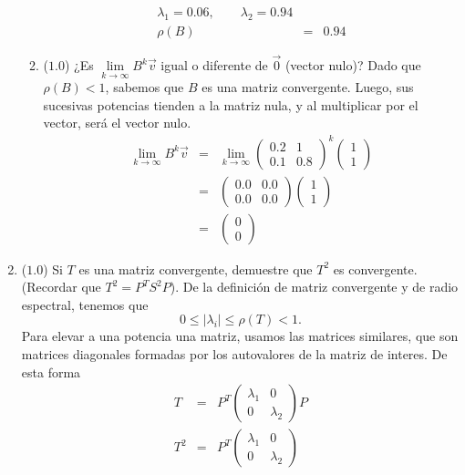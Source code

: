 \documentclass[12pt]{article}
\begin{document}
\begin{enumerate}[leftmargin=*,widest=9]
\begin{enumerate}[label=\alph*]
\begin{eqnarray*}
    \lambda_1 = 0.06, \qquad \lambda_2 = 0.94\\
    \rho(B) & = & 0.94
    \end{eqnarray*}
    \item (\(1.0\)) ¿Es \( \lim\limits_{k \rightarrow \infty}B^k \vec{v}\) igual o diferente de \(\vec{0}\) (vector nulo)?
    Dado que \(\rho(B) < 1\), sabemos que \(B\) es una matriz convergente. Luego, sus sucesivas potencias tienden a la matriz nula, y al multiplicar por el vector, será el vector nulo.
    \begin{eqnarray*}
    \lim\limits_{k \rightarrow \infty}B^k \vec{v} & = & \lim\limits_{k \rightarrow \infty}\begin{pmatrix}
    0.2 & 1 \\ 0.1 & 0.8
    \end{pmatrix}^k\begin{pmatrix}
    1 \\ 1
    \end{pmatrix} \\
    & = & \begin{pmatrix}
    0.0 & 0.0 \\ 0.0 & 0.0
    \end{pmatrix}\begin{pmatrix}
    1 \\ 1
    \end{pmatrix} \\
    & = & \begin{pmatrix}
    0 \\ 0
    \end{pmatrix}
    \end{eqnarray*}
    \end{enumerate}
  \item (\(1.0\)) Si \(T\) es una matriz convergente, demuestre que \(T^2\) es convergente. (Recordar que \(T^2 = P^T S^2 P\)).
  De la definición de matriz convergente y de radio espectral, tenemos que 
  \[ 0 \leq |\lambda_i| \leq \rho(T) < 1.\]
  Para elevar a una potencia una matriz, usamos las matrices similares, que son matrices diagonales formadas por los autovalores de la matriz de interes. De esta forma
  \begin{eqnarray*}
  T & = & P^T \begin{pmatrix}
  \lambda_1 & 0\\ 0 & \lambda_2
  \end{pmatrix} P\\
  T^2 & = & P^T \begin{pmatrix}
  \lambda_1 & 0\\ 0 & \lambda_2

\end{pmatrix}
\end{eqnarray*}
\end{enumerate}
\end{document}

